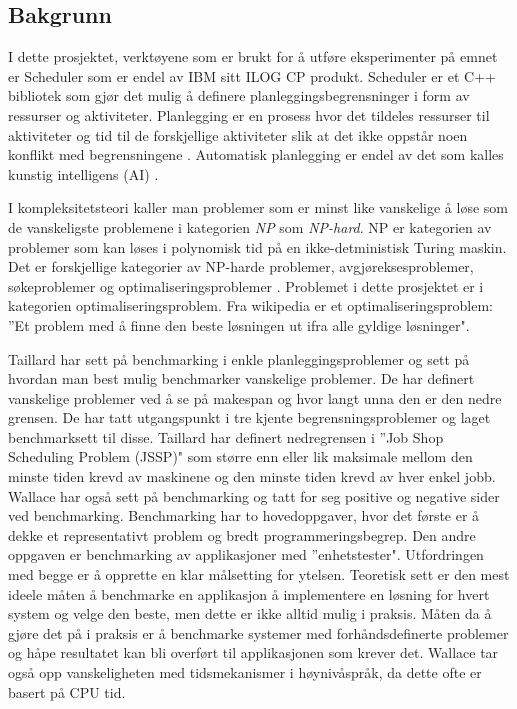 \subsection{Bakgrunn}
I dette prosjektet, verktøyene som er brukt for å utføre eksperimenter på emnet er Scheduler som er endel av IBM sitt ILOG CP produkt. Scheduler er et C++ bibliotek som gjør det mulig å definere planleggingsbegrensninger i form av ressurser og aktiviteter. Planlegging er en prosess hvor det tildeles ressurser til aktiviteter og tid til de forskjellige aktiviteter slik at det ikke oppstår noen konflikt med begrensningene \cite{Pape94implementationof}. Automatisk planlegging er endel av det som kalles kunstig intelligens (AI) .

I kompleksitetsteori \cite{compcomplextheory} kaller man problemer som er minst like vanskelige å løse som de vanskeligste problemene i kategorien \textit{NP} som \textit{NP-hard}. NP er kategorien av problemer som kan løses i polynomisk tid på en ikke-detministisk Turing  maskin. Det er forskjellige kategorier av NP-harde problemer, avgjøreksesproblemer, søkeproblemer og optimaliseringsproblemer \cite{nphardwikipedia}. Problemet i dette prosjektet er i kategorien optimaliseringsproblem. Fra wikipedia \cite{optimizationproblemwiki} er et optimaliseringsproblem: ''Et problem med å finne den beste løsningen ut ifra alle gyldige løsninger".

Taillard \cite{Taillard1993278} har sett på benchmarking i enkle planleggingsproblemer og sett på hvordan man best mulig benchmarker vanskelige problemer. De har definert vanskelige problemer ved å se på makespan og hvor langt unna den er den nedre grensen. De har tatt utgangspunkt i tre kjente begrensningsproblemer og laget benchmarksett til disse. Taillard har definert nedregrensen i ''Job Shop Scheduling Problem (JSSP)" som større enn eller lik maksimale mellom den minste tiden krevd av maskinene og den minste tiden krevd av hver enkel jobb. Wallace \cite{Wallace:2004:BCL:956860.956861} har også sett på benchmarking og tatt for seg positive og negative sider ved benchmarking. Benchmarking har to hovedoppgaver, hvor det første er å dekke et representativt problem og bredt programmeringsbegrep. Den andre oppgaven er benchmarking av applikasjoner med ''enhetstester". Utfordringen med begge er å opprette en klar målsetting for ytelsen. Teoretisk sett er den mest ideele måten å benchmarke en applikasjon å implementere en løsning for hvert system og velge den beste, men dette er ikke alltid mulig i praksis. Måten da å gjøre det på i praksis er å benchmarke systemer med forhåndsdefinerte problemer og håpe resultatet kan bli overført til applikasjonen som krever det. Wallace tar også opp vanskeligheten med tidsmekanismer i høynivåspråk, da dette ofte er basert på CPU tid.